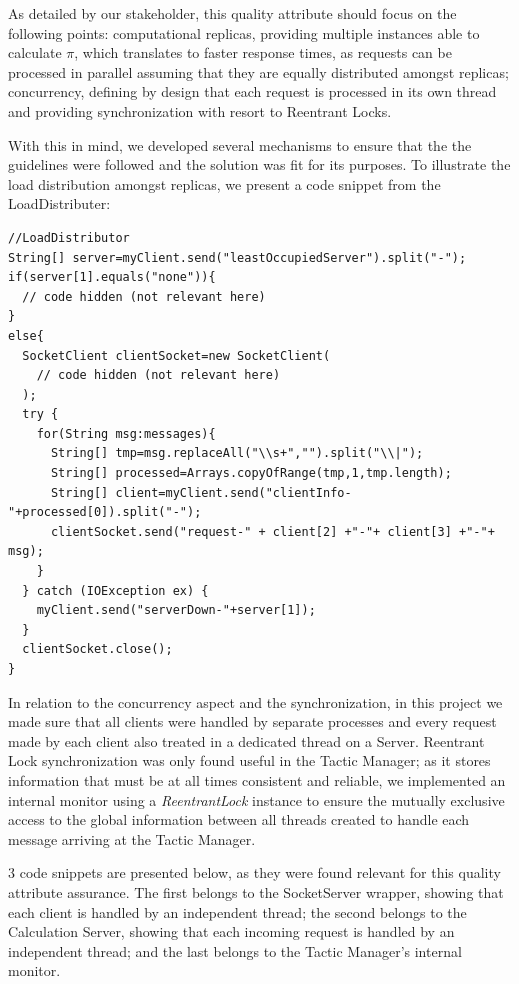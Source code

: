 \documentclass[12pt]{article}
\begin{document}
As detailed by our stakeholder, this quality attribute should focus on the following points: 
computational replicas, providing multiple instances able to calculate $\pi$, which translates to faster response times, as requests can be processed in 
parallel assuming that they are equally distributed amongst replicas;
concurrency, defining by design that each request is processed in its own thread and providing synchronization with resort to Reentrant Locks.

With this in mind, we developed several mechanisms to ensure that the the guidelines were followed and the solution was fit for its purposes.  
To illustrate the load distribution amongst replicas, we present a code snippet from the LoadDistributer:
 
\begin{lstlisting}[label={loadDistributor}]
//LoadDistributor
String[] server=myClient.send("leastOccupiedServer").split("-");
if(server[1].equals("none")){
  // code hidden (not relevant here)
}
else{
  SocketClient clientSocket=new SocketClient(
    // code hidden (not relevant here)
  );
  try {
    for(String msg:messages){
      String[] tmp=msg.replaceAll("\\s+","").split("\\|");
      String[] processed=Arrays.copyOfRange(tmp,1,tmp.length);
      String[] client=myClient.send("clientInfo-"+processed[0]).split("-");
      clientSocket.send("request-" + client[2] +"-"+ client[3] +"-"+ msg);
    }
  } catch (IOException ex) {
    myClient.send("serverDown-"+server[1]);
  }
  clientSocket.close();
}
\end{lstlisting}

\newpage
In relation to the concurrency aspect and the synchronization, in this project we made sure that all clients were handled by separate processes and every request 
made by each client also treated in a dedicated thread on a Server. 
Reentrant Lock synchronization was only found useful in the Tactic Manager; as it stores information that must be at all times consistent and reliable, we 
implemented an internal monitor using a \textit{ReentrantLock} instance to ensure the mutually exclusive access to the global information between all threads 
created to handle each message arriving at the Tactic Manager.

3 code snippets are presented below, as they were found relevant for this quality attribute assurance.
The first belongs to the SocketServer wrapper, showing that each client is handled by an independent thread;
the second belongs to the Calculation Server, showing that each incoming request is handled by an independent thread;
and the last belongs to the Tactic Manager's internal monitor.
\end{document}
